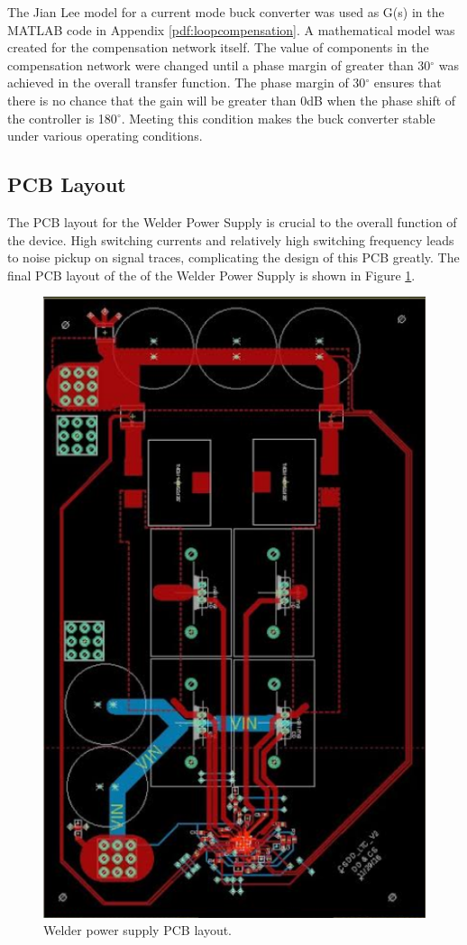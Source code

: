 \documentclass[11pt]{article}
\begin{document}
    \noident The Jian Lee model for a current mode buck converter was used as G(s) in the MATLAB code in Appendix \ref{pdf:loopcompensation}. A mathematical model was created for the compensation network itself. The value of components in the compensation network were changed until a phase margin of greater than 30$^{\circ}$ was achieved in the overall transfer function. The phase margin of 30$^{\circ}$ ensures that there is no chance that the gain will be greater than 0dB when the phase shift of the controller is 180$^{\circ}$. Meeting this condition makes the buck converter stable under various operating conditions.
    
    \subsection{PCB Layout}
    
    \noindent The PCB layout for the Welder Power Supply is crucial to the overall function of the device. High switching currents and relatively high switching frequency leads to noise pickup on signal traces, complicating the design of this PCB greatly. The final PCB layout of the of the Welder Power Supply is shown in Figure \ref{pcb}.
    
    \begin{figure}[H]
        \centering
        \includegraphics[width=0.3\linewidth]{pcblayout.PNG}
        \caption{Welder power supply PCB layout.}
        \label{pcb}
    \end{figure}
    
\end{document}
